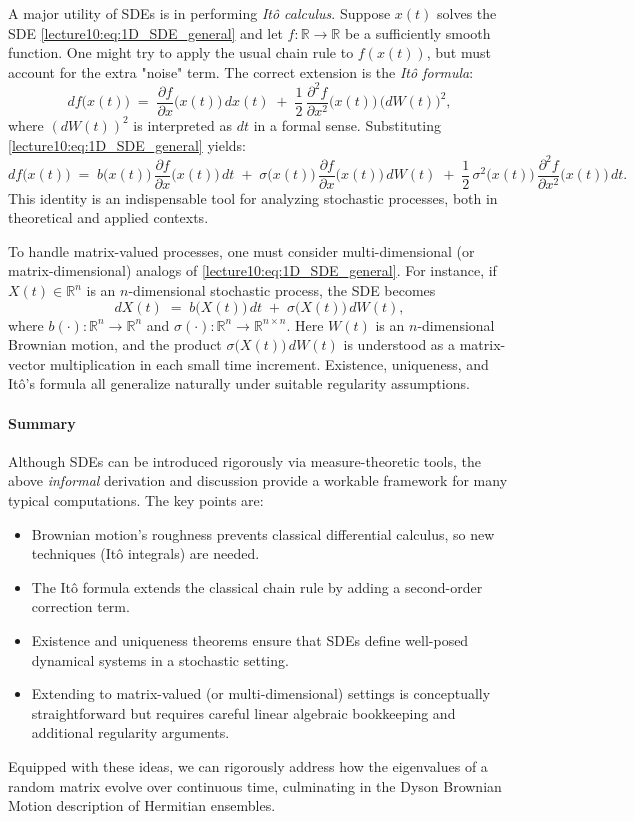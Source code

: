 \documentclass[letterpaper,11pt,oneside,reqno]{book}
\numberwithin{equation}{chapter}  %
\theoremstyle{definition}
\begin{document}
\medskip
A major utility of SDEs is in performing \emph{It\^{o} calculus}. Suppose \(x(t)\) solves the SDE \eqref{lecture10:eq:1D_SDE_general} and let \(f\colon\mathbb{R}\to\mathbb{R}\) be a sufficiently smooth function. One might try to apply the usual chain rule to \(f(x(t))\), but must account for the extra "noise" term. The correct extension is the \emph{It\^{o} formula}:
\[
df\bigl(x(t)\bigr)
\;=\;
\frac{\partial f}{\partial x}\bigl(x(t)\bigr)\,dx(t)
\;+\;\frac12\,
\frac{\partial^2 f}{\partial x^2}\bigl(x(t)\bigr)\,\bigl(dW(t)\bigr)^2,
\]
where \((dW(t))^2\) is interpreted as \(dt\) in a formal sense. Substituting \eqref{lecture10:eq:1D_SDE_general} yields:
\[
df\bigl(x(t)\bigr)
\;=\;
b\bigl(x(t)\bigr)\,\frac{\partial f}{\partial x}\bigl(x(t)\bigr)\,dt
\;+\;
\sigma\bigl(x(t)\bigr)\,\frac{\partial f}{\partial x}\bigl(x(t)\bigr)\,dW(t)
\;+\;
\frac12\,\sigma^2\bigl(x(t)\bigr)\,\frac{\partial^2 f}{\partial x^2}\bigl(x(t)\bigr)\,dt.
\]
This identity is an indispensable tool for analyzing stochastic processes, both in theoretical and applied contexts.

\medskip
To handle matrix-valued processes, one must consider multi-dimensional (or matrix-dimensional) analogs of \eqref{lecture10:eq:1D_SDE_general}. For instance, if \(X(t)\in\mathbb{R}^n\) is an \(n\)-dimensional stochastic process, the SDE becomes
\[
dX(t)
\;=\;
b\bigl(X(t)\bigr)\,dt
\;+\;
\sigma\bigl(X(t)\bigr)\,dW(t),
\]
where \(b(\cdot)\colon\mathbb{R}^n\to\mathbb{R}^n\) and \(\sigma(\cdot)\colon\mathbb{R}^n\to \mathbb{R}^{n\times n}\). Here \(W(t)\) is an \(n\)-dimensional Brownian motion, and the product \(\sigma\bigl(X(t)\bigr)\,dW(t)\) is understood as a matrix-vector multiplication in each small time increment. Existence, uniqueness, and It\^{o}'s formula all generalize naturally under suitable regularity assumptions.

\paragraph{Summary}
Although SDEs can be introduced rigorously via measure-theoretic tools, the above \emph{informal} derivation and discussion provide a workable framework for many typical computations. The key points are:
\begin{itemize}
\item Brownian motion's roughness prevents classical differential calculus, so new techniques (It\^{o} integrals) are needed.
\item The It\^{o} formula extends the classical chain rule by adding a second-order correction term.
\item Existence and uniqueness theorems ensure that SDEs define well-posed dynamical systems in a stochastic setting.
\item Extending to matrix-valued (or multi-dimensional) settings is conceptually straightforward but requires careful linear algebraic bookkeeping and additional regularity arguments.
\end{itemize}
Equipped with these ideas, we can rigorously address how the eigenvalues of a random matrix evolve over continuous time, culminating in the Dyson Brownian Motion description of Hermitian ensembles.
\end{document}
